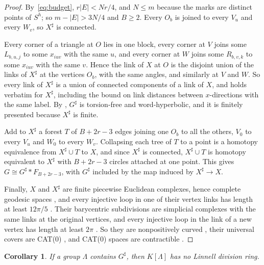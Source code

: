 \documentclass[11pt]{article}
\newtheorem{corollary}[theorem]{Corollary}
\theoremstyle{definition}
\theoremstyle{remark}
\numberwithin{equation}{section}
\begin{document}
\begin{proof}
By~\eqref{eq:budget}, $r|E|<Nr/4$, and $N\le m$ because the marks are distinct points of $S^h$; so $m-|E|>3N/4$ and $B\ge2$. Every $O_b$ is joined to every $V_u$ and every $W_v$, so $X^\sharp$ is connected.

Every corner of a triangle at $O$ lies in one block, every corner at $V$ joins some $L_{b,u,j}$ to some $x_{iuv}$ with the same $u$, and every corner at $W$ joins some $R_{b,v,k}$ to some $x_{iuv}$ with the same $v$. Hence the link of $X$ at $O$ is the disjoint union of the links of $X^\sharp$ at the vertices $O_b$, with the same angles, and similarly at $V$ and $W$. So every link of $X^\sharp$ is a union of connected components of a link of $X$, and \cite[Lemma~2.3]{OAI252} holds verbatim for $X^\sharp$, including the bound on link distances between $x$-directions with the same label. By \cite[Theorem~2.1]{OAI252}, $G^\sharp$ is torsion-free and word-hyperbolic, and it is finitely presented because $X^\sharp$ is finite.

Add to $X^\sharp$ a forest $T$ of $B+2r-3$ edges joining one $O_b$ to all the others, $V_0$ to every $V_u$ and $W_0$ to every $W_v$. Collapsing each tree of $T$ to a point is a homotopy equivalence from $X^\sharp\cup T$ to $X$, and since $X^\sharp$ is connected, $X^\sharp\cup T$ is homotopy equivalent to $X^\sharp$ with $B+2r-3$ circles attached at one point. This gives $G\cong G^\sharp*F_{B+2r-3}$, with $G^\sharp$ included by the map induced by $X^\sharp\to X$.

Finally, $X$ and $X^\sharp$ are finite piecewise Euclidean complexes, hence complete geodesic spaces \cite[Theorem~I.7.50]{BH1999}, and every injective loop in one of their vertex links has length at least $12\pi/5$ \cite[Lemma~2.3]{OAI252}. Their barycentric subdivisions are simplicial complexes with the same links at the original vertices, and every injective loop in the link of a new vertex has length at least $2\pi$ \cite[Section~3.1]{OAI252}. So they are nonpositively curved \cite[Theorem~II.5.2 and Lemma~II.5.6]{BH1999}, their universal covers are CAT(0) \cite[Theorem~II.4.1(2)]{BH1999}, and CAT(0) spaces are contractible \cite[Corollary~II.1.5]{BH1999}.
\end{proof}

\begin{corollary}\label{cor:split-linnell}
If a group $\Lambda$ contains $G^\sharp$, then $K[\Lambda]$ has no Linnell division ring.
\end{corollary}
\end{document}
